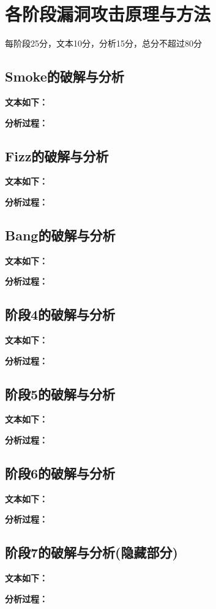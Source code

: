 \section{各阶段漏洞攻击原理与方法}
\begin{center}
    每阶段25分，文本10分，分析15分，总分不超过80分
\end{center}

\subsection{Smoke的破解与分析}

\textbf{文本如下：}

\textbf{分析过程：}

\subsection{Fizz的破解与分析}

\textbf{文本如下：}

\textbf{分析过程：}

\subsection{Bang的破解与分析}

\textbf{文本如下：}

\textbf{分析过程：}

\subsection{阶段4的破解与分析}

\textbf{文本如下：}

\textbf{分析过程：}

\subsection{阶段5的破解与分析}

\textbf{文本如下：}

\textbf{分析过程：}

\subsection{阶段6的破解与分析}

\textbf{文本如下：}

\textbf{分析过程：}

\subsection{阶段7的破解与分析(隐藏部分)}

\textbf{文本如下：}

\textbf{分析过程：}